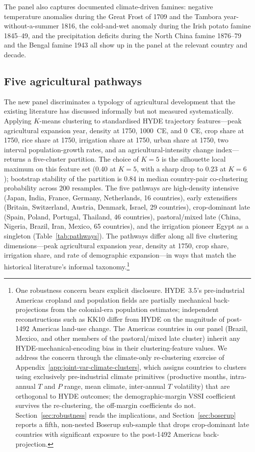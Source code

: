 \documentclass[11pt,letterpaper]{article}
\begin{document}
The panel also captures documented climate-driven famines: negative temperature anomalies during the Great Frost of 1709 and the Tambora year-without-a-summer 1816, the cold-and-wet anomaly during the Irish potato famine 1845--49, and the precipitation deficits during the North China famine 1876--79 and the Bengal famine 1943 all show up in the panel at the relevant country and decade.

\subsection{Five agricultural pathways}
\label{sec:pathways}

The new panel discriminates a typology of agricultural development that the existing literature has discussed informally but not measured systematically. Applying $K$-means clustering to standardised HYDE trajectory features---peak agricultural expansion year, density at 1750, 1000~CE, and 0~CE, crop share at 1750, rice share at 1750, irrigation share at 1750, urban share at 1750, two interval population-growth rates, and an agricultural-intensity change index---returns a five-cluster partition. The choice of $K=5$ is the silhouette local maximum on this feature set (0.40 at $K=5$, with a sharp drop to 0.23 at $K=6$); bootstrap stability of the partition is 0.84 in median country-pair co-clustering probability across 200 resamples. The five pathways are high-density intensive (Japan, India, France, Germany, Netherlands, 16 countries), early extensifiers (Britain, Switzerland, Austria, Denmark, Israel, 29 countries), crop-dominant late (Spain, Poland, Portugal, Thailand, 46 countries), pastoral/mixed late (China, Nigeria, Brazil, Iran, Mexico, 65 countries), and the irrigation pioneer Egypt as a singleton (Table~\ref{tab:pathways}). The pathways differ along all five clustering dimensions---peak agricultural expansion year, density at 1750, crop share, irrigation share, and rate of demographic expansion---in ways that match the historical literature's informal taxonomy.\footnote{One robustness concern bears explicit disclosure. HYDE~3.5's pre-industrial Americas cropland and population fields are partially mechanical back-projections from the \citet{koch2019} colonial-era population estimates; independent reconstructions such as KK10 \citep{kaplan2011} differ from HYDE on the magnitude of post-1492 Americas land-use change. The Americas countries in our panel (Brazil, Mexico, and other members of the pastoral/mixed late cluster) inherit any HYDE-mechanical-encoding bias in their clustering-feature values. We address the concern through the climate-only re-clustering exercise of Appendix~\ref{app:joint-var-climate-clusters}, which assigns countries to clusters using exclusively pre-industrial climate primitives (productive months, intra-annual $T$ and $P$ range, mean climate, inter-annual $T$ volatility) that are orthogonal to HYDE outcomes; the demographic-margin VSSI coefficient survives the re-clustering, the off-margin coefficients do not. Section~\ref{sec:robustness} reads the implications, and Section~\ref{sec:boserup} reports a fifth, non-nested Boserup sub-sample that drops crop-dominant late countries with significant exposure to the post-1492 Americas back-projection.}
\end{document}
